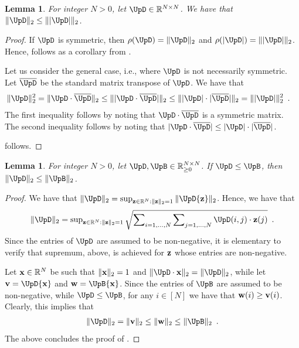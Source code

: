 \documentclass[11pt,reqno]{amsart}
\numberwithin{equation}{section}
\newtheorem{lemma}[theorem]{Lemma}
\newcommand{\blue}[1]{{\color{blue}#1}}
\newcommand{\capri}[1]{{\color{capri}#1}}
\newcommand{\goldenbrown}[1]{{\color{goldenbrown}#1}}
\newcommand{\spradius}{{\rho}}
\newcommand{\norm}[2]{\goldenbrown{\|} #1 \goldenbrown{\|}_{#2}}
\newcommand{\nnorm}[3]{\goldenbrown{\|} #1\goldenbrown{\|}^{#2}_{#3}}
\newcommand{\abs}[1]{\blue{|}#1\blue{|}}
\renewcommand{\blue}[1]{#1}
\renewcommand{\capri}[1]{#1}
\renewcommand{\goldenbrown}[1]{#1}
\newcommand{\ki}{\capri{i}}
\renewcommand{\ki}{i}
\begin{document}
\begin{lemma}\label{lemma:AbsoluteVs2Norm}
For integer $N>0$, let $\UpD\in \mathbb{R}^{N\times N}$. We have that $\norm {\UpD}{2}\leq \norm{ \abs{ \UpD}}{2}$.
\end{lemma}
\begin{proof}
If $\UpD$ is symmetric, then $\spradius(\UpD)=\norm{ \UpD}{2}$ and $\spradius(\abs{\UpD}) = \norm{ \abs{ \UpD}}{2}$.
Hence,  follows as a corollary from . 

Let us consider the general case, i.e., where $\UpD$ is not necessarily symmetric.
Let $\overline{\UpD}$ be the standard matrix transpose of $\UpD$. We have that
\begin{align}
\nnorm{ \UpD}{2}{2} = \norm{ \UpD\cdot \overline{\UpD}}{2} &\leq \norm{ \abs{ \UpD\cdot \overline{\UpD}}}{2} \leq 
\norm{ \abs{\UpD} \cdot \abs{\overline{\UpD}}}{2}=\nnorm{ \abs{\UpD}}{2}{2}\enspace.
\end{align}
The first inequality follows by noting that $\UpD\cdot \overline{\UpD}$ is a symmetric matrix. The second inequality follows by noting that
$\abs{ \UpD\cdot \overline{\UpD}}\leq \abs{ \UpD} \cdot \abs{\overline{\UpD}}$. 

 follows. 
\end{proof}


\begin{lemma}\label{lemma:MonotonicityVs2Norm}
For integer $N>0$, let $\UpD, \UpB\in \mathbb{R}^{N\times N}_{\geq 0}$. If $\UpD\leq \UpB$, then $\norm{ \UpD}{2}\leq \norm{ \UpB}{2}$.
\end{lemma}
\begin{proof}
We have that $\norm{ \UpD}2=\sup_{{\bf z}\in \mathbb{R}^N: \norm{ {\bf z}}{2}=1}{\norm{ \UpD {\bf z}}{2}}$.
Hence, we have that
\begin{align}
\norm{ \UpD}{2}=\sup\nolimits_{{\bf z}\in \mathbb{R}^N: \norm{ {\bf z}}{2}=1}\sqrt{\sum\nolimits_{\ki=1,\ldots,N} 
\sum\nolimits_{j=1,\ldots, N} \UpD(\ki,j)\cdot{\bf z}(j)} \enspace.
\end{align}
Since the entries of $\UpD$ are assumed to be non-negative, it is elementary to verify that supremum, above, is achieved for 
 ${\bf z}$ whose entries are non-negative. 

Let ${\bf x}\in \mathbb{R}^{N}$ be such that $\norm{ {\bf x}}{2}=1$ and $\norm{ \UpD \cdot {\bf x}}{2}=\norm{ \UpD}{2} $, while
let ${\bf v}=\UpD{\bf x}$ and ${\bf w}=\UpB{\bf x}$. Since the entries of $\UpB$ are assumed to be non-negative, while $\UpD\leq \UpB$, 
for any $i\in [N]$ we have that ${\bf w}(i)\geq {\bf v}(i)$. Clearly, this implies that
\begin{align}
\norm{ \UpD}{2}=\norm{ {\bf v}}{2} \leq \norm{ {\bf w}}{2} \leq \norm{ \UpB}{2}\enspace. 
\end{align}
The above concludes the proof of .
\end{proof}
\end{document}
